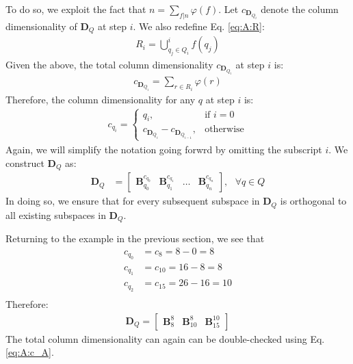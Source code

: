     To do so, we exploit the fact that $n = \sum_{f|n} \varphi(f)$. Let $c_{\bm{D}_{Q_i}}$ denote the column dimensionality of $\bm{D}_Q$ at step $i$. We also redefine Eq. \eqref{eq:A:R}:
    \begin{align}\label{eq:A:onlyPeriods:R}
        R_i = \bigcup^i_{q_j \in Q_i} f(q_j)
    \end{align}
    Given the above, the total column dimensionality $c_{\bm{D}_{Q_i}}$ at step $i$ is:
    \begin{align*}
        c_{\bm{D}_{Q_i}} = \sum_{r \in R_i} \varphi(r)
    \end{align*}
    Therefore, the column dimensionality for any $q$ at step $i$ is:
    \begin{align}\label{eq:A:noFactors:cp}
        c_{q_i} =
            \begin{cases}
                q_i, & \text{if } i = 0 \\
                c_{\bm{D}_{Q_i}} - c_{\bm{D}_{Q_{i-1}}}, & \text{otherwise}
            \end{cases}
    \end{align}
    Again, we will simplify the notation going forwrd by omitting the subscript $i$. We construct $\bm{D}_Q$ as:
    \begin{align*}
        \bm{D}_Q &= \begin{bmatrix}
                \bm{B}_{q_0}^{c_{q_0}} &
                \bm{B}_{q_1}^{c_{q_1}} &
                \hdots &
                \bm{B}_{q_n}^{c_{q_n}}
            \end{bmatrix}
            , \text{ } \forall q \in Q
    \end{align*}
    In doing so, we ensure that for every subsequent subspace in $\bm{D}_Q$ is orthogonal to all existing subspaces in $\bm{D}_Q$.

    Returning to the example in the previous section, we see that
    \begin{align*}
        c_{q_0} &= c_{8} = 8 - 0 = 8 \\
        c_{q_1} &= c_{10} = 16 - 8 = 8 \\
        c_{q_2} &= c_{15} = 26 - 16 = 10 \\
    \end{align*}
    Therefore:
    \begin{align*}
        \bm{D}_Q = \begin{bmatrix}
            \bm{B}_{8}^{8} & \bm{B}_{10}^{8} & \bm{B}_{15}^{10}
        \end{bmatrix}
    \end{align*}
    The total column dimensionality can again can be double-checked using Eq. \eqref{eq:A:c_A}.

